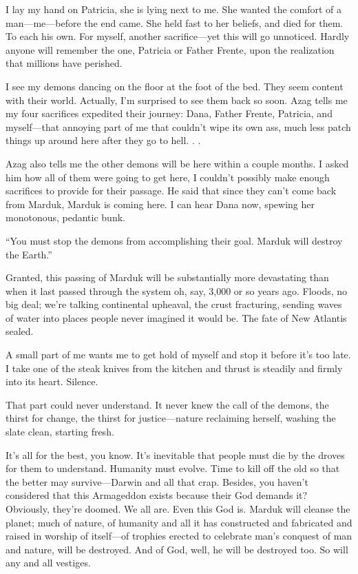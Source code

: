 I lay my hand on Patricia, she is lying next to me. She wanted the
comfort of a man---me---before the end came. She held fast to her
beliefs, and died for them. To each his own. For myself, another
sacrifice---yet this will go unnoticed. Hardly anyone will remember the
one, Patricia or Father Frente, upon the realization that millions have
perished.

I see my demons dancing on the floor at the foot of the bed. They seem
content with their world. Actually, I'm surprised to see them back so
soon. Azag tells me my four sacrifices expedited their journey: Dana,
Father Frente, Patricia, and myself---that annoying part of me that
couldn't wipe its own ass, much less patch things up around here after
they go to hell. . .

Azag also tells me the other demons will be here within a couple months.
I asked him how all of them were going to get here, I couldn't possibly
make enough sacrifices to provide for their passage. He said that since
they can't come back from Marduk, Marduk is coming here. I can hear Dana
now, spewing her monotonous, pedantic bunk.

``You must stop the demons from accomplishing their goal. Marduk will
destroy the Earth.''

Granted, this passing of Marduk will be substantially more devastating
than when it last passed through the system oh, say, 3,000 or so years
ago. Floods, no big deal; we're talking continental upheaval, the crust
fracturing, sending waves of water into places people never imagined it
would be. The fate of New Atlantis sealed.

A small part of me wants me to get hold of myself and stop it before
it's too late. I take one of the steak knives from the kitchen and
thrust is steadily and firmly into its heart. Silence.

That part could never understand. It never knew the call of the demons,
the thirst for change, the thirst for justice---nature reclaiming
herself, washing the slate clean, starting fresh.

It's all for the best, you know. It's inevitable that people must die by
the droves for them to understand. Humanity must evolve. Time to kill
off the old so that the better may survive---Darwin and all that crap.
Besides, you haven't considered that this Armageddon exists because
their God demands it? Obviously, they're doomed. We all are. Even this
God is. Marduk will cleanse the planet; much of nature, of humanity and
all it has constructed and fabricated and raised in worship of
itself---of trophies erected to celebrate man's conquest of man and
nature, will be destroyed. And of God, well, he will be destroyed too.
So will any and all vestiges.

